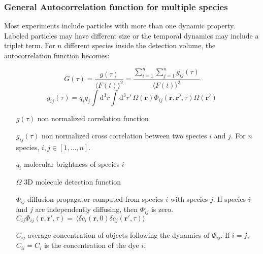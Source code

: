 \subsubsection{General Autocorrelation function for multiple species}
Most experiments include particles with more than one dynamic property. Labeled particles may have different size or the temporal dynamics may include a triplet term. For $n$ different species inside the detection volume, the autocorrelation function becomes:
	\newline
	\newline
	\begin{minipage}{\textwidth}
	\begin{equation}
	G(\tau) = \frac{g(\tau)}{\langle F(t) \rangle^2} =  \frac{\sum_{i=1}^n \sum_{j=1}^n g_{ij}(\tau)}{\langle F(t) \rangle^2}
	\end{equation}
	\begin{equation}
	g_{ij}(\tau) = q_i q_j \int \! \mathrm{d}^3 r \int \! \mathrm{d}^3 r'  \, \Omega(\mathbf{r})\Phi_{ij}(\mathbf{r}, \mathbf{r'}, \tau) \Omega(\mathbf{r'})  
	\end{equation}
	\begin{itemize} \small
	\item[$g(\tau)$] non normalized correlation function
	\item[$g_{ij}(\tau)$] non normalized cross correlation between two species $i$ and $j$. For $n$ species, $i,j \in [1,...,n]$.
	\item[$q_i$] molecular brightness of species $i$
	\item[$\Omega$] 3D molecule detection function
	\item[$\Phi_{ij}$] diffusion propagator computed from species $i$ with species $j$. If species $i$ and $j$ are independently diffusing, then $\Phi_{ij}$ is zero. 
	$ C_{ij} \Phi_{ij}(\mathbf{r}, \mathbf{r'}, \tau) = \, \langle \delta c_i(\mathbf{r},0) \delta c_j(\mathbf{r'}, \tau) \rangle $ 
	\item[$C_{ij}$] average concentration of objects following the dynamics of $\Phi_{ij}$. If $i=j$, $C_{ii}=C_i$ is the concentration of the dye $i$.
	\end{itemize}
	\end{minipage}
